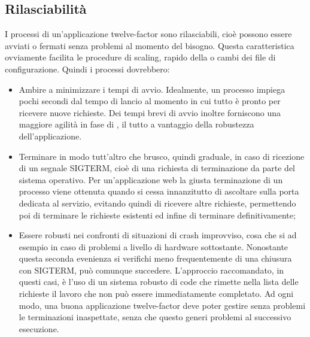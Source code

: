 \documentclass[NormeDiProgetto.tex]{subfiles}
\begin{document}
\subsection{Rilasciabilità}
I processi di un'applicazione twelve-factor sono rilasciabili, cioè possono essere avviati o fermati senza problemi al momento del bisogno. Questa caratteristica ovviamente facilita le procedure di scaling,  rapido della  o cambi dei file di configurazione.
Quindi i processi dovrebbero:
\begin{itemize}
\item Ambire a minimizzare i tempi di avvio. Idealmente, un processo impiega pochi secondi dal tempo di lancio al momento in cui tutto è pronto per ricevere nuove richieste. Dei tempi brevi di avvio inoltre forniscono una maggiore agilità in fase di , il tutto a vantaggio della robustezza dell'applicazione.
\item Terminare in modo tutt'altro che brusco, quindi graduale, in caso di ricezione di un segnale SIGTERM, cioè di una richiesta di terminazione da parte del sistema operativo. Per un'applicazione web la giusta terminazione di un processo viene ottenuta quando si cessa innanzitutto di ascoltare sulla porta dedicata al servizio, evitando quindi di ricevere altre richieste, permettendo poi di terminare le richieste esistenti ed infine di terminare definitivamente;
\item Essere robusti nei confronti di situazioni di crash improvviso, cosa che si  ad esempio in caso di problemi a livello di hardware sottostante. Nonostante questa seconda evenienza si verifichi meno frequentemente di una chiusura con SIGTERM, può comunque succedere. L'approccio raccomandato, in questi casi, è l'uso di un sistema robusto di code che rimette nella lista delle richieste il lavoro che non può essere immediatamente completato. Ad ogni modo, una buona applicazione twelve-factor deve poter gestire senza problemi le terminazioni inaspettate, senza che questo generi problemi al successivo esecuzione.
\end{itemize}
\end{document}
